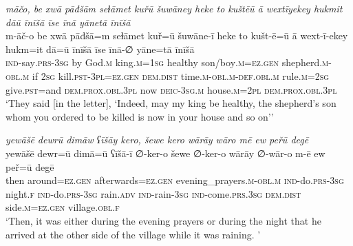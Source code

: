 \ea \label{KŠ.51}
\textit{māčo, be xwā pāđšām seɫāmet kuřū šuwāney heke to kuštēū ā wextīyekey hukmit dāū īnīšā īse īnā yānetā īnīšā} \\ 
\gll m-āč-o be xwā pāđšā=m seɫāmet kuř=ū šuwāne-ī heke to kušt-ē=ū ā wext-ī-ekey hukm=it dā=ū īnīšā īse īnā-∅ yāne=tā īnīšā \\ 
 \textsc{ind-}say\textsc{.prs}\textsc{-3sg} by God\textsc{.m} king\textsc{.m}\textsc{=\textsc{1sg}} healthy son/boy\textsc{.m}\textsc{=ez.gen} shepherd\textsc{.m}\textsc{-obl}\textsc{.m} if \textsc{2sg} kill\textsc{.pst}\textsc{-3pl}\textsc{=ez.gen} \textsc{dem.dist} time\textsc{.m}\textsc{-obl}\textsc{.m}\textsc{-def}\textsc{.obl}\textsc{.m} rule\textsc{.m}\textsc{=\textsc{2sg}} give\textsc{.pst}=and \textsc{dem.prox}\textsc{.obl}\textsc{.3pl} now \textsc{deic}\textsc{-3sg}\textsc{.m} house\textsc{.m}=\textsc{2pl} \textsc{dem.prox}\textsc{.obl}\textsc{.3pl} \\ 
\glt `They said [in the letter], ‘Indeed, may my king be healthy, the shepherd’s son whom you ordered to be killed is now in your house and so on’'
\z 
 
\ea \label{KŠ.59}
\textit{yewāšē dewrū dimāw ʕīšāy kero, šewe kero wārāy wāro mē ew peřū degē} \\ 
\gll yewāšē dewr=ū dimā=ū ʕīšā-ī ∅-ker-o šewe ∅-ker-o wārāy ∅-wār-o m-ē ew peř=ū degē \\ 
 then around\textsc{\textsc{=ez.gen}} afterwards\textsc{\textsc{=ez.gen}} evening\_prayers\textsc{.m}\textsc{-obl}\textsc{.m} \textsc{ind-}do\textsc{.prs}\textsc{-3sg} night\textsc{.f} \textsc{ind-}do\textsc{.prs}\textsc{-3sg} rain\textsc{.adv} \textsc{ind-}rain\textsc{-3sg} \textsc{ind-}come\textsc{.prs}\textsc{.3sg} \textsc{dem.dist} side\textsc{.m}\textsc{\textsc{=ez.gen}} village\textsc{.obl}\textsc{.f} \\ 
\glt `Then, it was either during the evening prayers or during the night that he arrived at the other side of the village while it was raining. '
\z 
 
